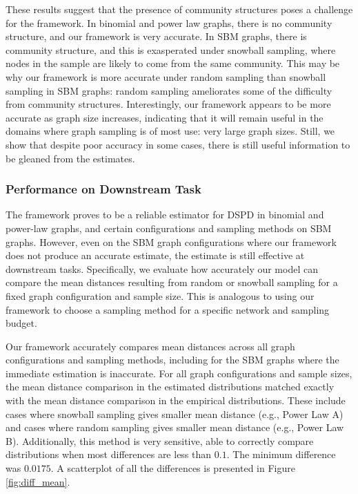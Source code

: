 These results suggest that the presence of community structures poses a challenge for the framework. In binomial and power law graphs, there is no community structure, and our framework is very accurate. In SBM graphs, there is community structure, and this is exasperated under snowball sampling, where nodes in the sample are likely to come from the same community. This may be why our framework is more accurate under random sampling than snowball sampling in SBM graphs: random sampling ameliorates some of the difficulty from community structures. Interestingly, our framework appears to be more accurate as graph size increases, indicating that it will remain useful in the domains where graph sampling is of most use: very large graph sizes. Still, we show that despite poor accuracy in some cases, there is still useful information to be gleaned from the estimates.

\subsubsection{Performance on Downstream Task}

The framework proves to be a reliable estimator for DSPD in binomial and power-law graphs, and certain configurations and sampling methods on SBM graphs. However, even on the SBM graph configurations where our framework does not produce an accurate estimate, the estimate is still effective at downstream tasks. Specifically, we evaluate how accurately our model can compare the mean distances resulting from random or snowball sampling for a fixed graph configuration and sample size. This is analogous to using our framework to choose a sampling method for a specific network and sampling budget.

Our framework accurately compares mean distances across all graph configurations and sampling methods, including for the SBM graphs where the immediate estimation is inaccurate. For all graph configurations and sample sizes, the mean distance comparison in the estimated distributions matched exactly with the mean distance comparison in the empirical distributions. These include cases where snowball sampling gives smaller mean distance (e.g., Power Law A) and cases where random sampling gives smaller mean distance (e.g., Power Law B). Additionally, this method is very sensitive, able to correctly compare distributions when most differences are less than $0.1$. The minimum difference was $0.0175$. A scatterplot of all the differences is presented in Figure \ref{fig:diff_mean}.


